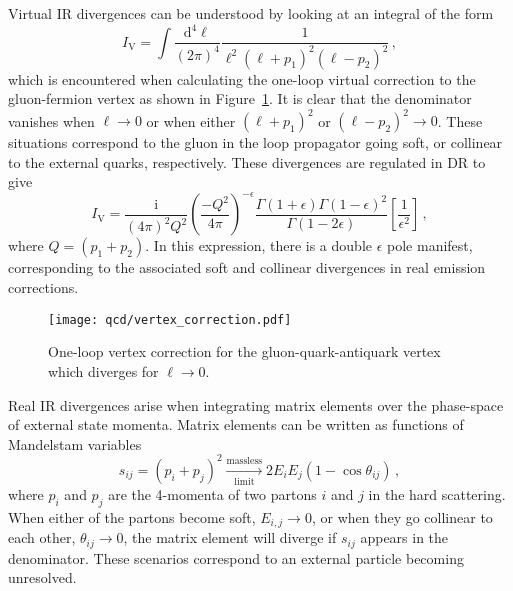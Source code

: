 \documentclass[main.tex]{subfiles}
\begin{document}
    Virtual IR divergences can be understood by looking
    at an integral of the form
    \begin{equation}\label{eqn:virtual_IR_integral}
        I_{\mathrm{V}} = \int \dfrac{\mathrm{d}^{4}\ell}{(2\pi)^{4}} \dfrac{1}{\ell^{2}(\ell+p_{1})^{2}(\ell-p_{2})^{2}} \, ,
    \end{equation}
    which is encountered when calculating the one-loop
    virtual correction to the gluon-fermion vertex
    as shown in Figure~\ref{fig:vertex_correction}.
    It is clear that the denominator vanishes when $\ell \rightarrow 0$
    or when either $(\ell + p_{1})^{2}$ or $(\ell - p_{2})^{2} \rightarrow 0$.
    These situations correspond to the gluon in the loop propagator
    going soft, or collinear to the external quarks, respectively.
    These divergences are regulated in DR to give
    \begin{equation}\label{eqn:virtual_IR_DR}
        I_{\mathrm{V}} = \dfrac{\mathrm{i}}{(4\pi)^{2}Q^{2}}\left(\dfrac{-Q^{2}}{4\pi}\right)^{-\epsilon}\dfrac{\Gamma(1+\epsilon)\Gamma(1-\epsilon)^{2}}{\Gamma(1-2\epsilon)}\left[\dfrac{1}{\epsilon^{2}}\right] \, ,
    \end{equation}
    where $Q = (p_{1} + p_{2})$. In this expression, there is a double $\epsilon$ pole manifest,
    corresponding to the associated soft and collinear divergences in real emission corrections.

    \begin{figure}
        \texttt{[image: qcd/vertex\_correction.pdf]}
        \caption{One-loop vertex correction for the gluon-quark-antiquark vertex which diverges
        for $\ell \rightarrow 0$.}
        \label{fig:vertex_correction}
    \end{figure}

    Real IR divergences arise when integrating
    matrix elements over the phase-space of external state momenta.
    Matrix elements can be written as functions of Mandelstam variables
    \begin{equation}\label{eqn:mandelstam}
        s_{ij} = (p_{i} + p_{j})^{2} \xrightarrow[\mathrm{limit}]{\mathrm{massless}} 2 E_{i}E_{j}(1-\cos \theta_{ij}) \, ,
    \end{equation}
    where $p_{i}$ and $p_{j}$ are the 4-momenta of two partons $i$ and $j$
    in the hard scattering.
    When either of the partons become soft, $E_{i,j}\rightarrow 0$,
    or when they go collinear to each other, $\theta_{ij} \rightarrow 0$,
    the matrix element will diverge if $s_{ij}$ appears
    in the denominator. These scenarios correspond to an external
    particle becoming unresolved.
\end{document}
